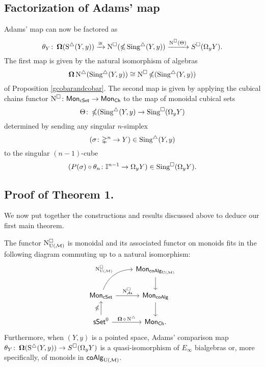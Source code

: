 \subsection{Factorization of Adams' map}\label{factorization}

Adams' map can now be factored as 
$$\theta_Y \colon \operatorname{\mathbf{\Omega}}(\operatorname{S^{\triangle}}(Y, y)) \xrightarrow{\cong} 
\operatorname{N^{\square}}(\operatorname{\mathbb{\Omega}} \operatorname{Sing^{\triangle}}(Y, y)) \xrightarrow{\operatorname{N^{\square}}(\Theta)} 
S^{\square}(\Omega_y Y).$$
The first map is given by the natural isomorphism of algebras $$\operatorname{\mathbf{\Omega}} \operatorname{N^{\triangle}} (\operatorname{Sing^{\triangle}}(Y, y)) \cong  \operatorname{N^{\square}} \operatorname{\mathbb{\Omega}} (\operatorname{Sing^{\triangle}}(Y, y))$$ of Proposition \ref{gcobarandcobar}. The second map is given by applying the cubical chains functor $\operatorname{N^{\square}} \colon \mathsf{Mon}_{\mathsf{cSet}} \to \mathsf{Mon}_{\mathsf{Ch}}$ to the map of monoidal cubical sets
$$\Theta \colon \operatorname{\mathbb{\Omega}} (\operatorname{Sing^{\triangle}}(Y, y) \to \operatorname{Sing^{\square}}( \Omega_yY)$$
determined by sending any singular $n$-simplex $$(\sigma\colon \mathbb{\Delta}^n \to Y) \in \operatorname{Sing^{\triangle}}(Y, y)$$ to the singular $(n-1)$-cube $$(P(\sigma) \circ \theta_n \colon \mathbb{I}^{n-1} \to \Omega_yY) \in \operatorname{Sing^{\square}}( \Omega_yY).$$ 

\subsection{Proof of Theorem 1.}
We now put together the constructions and results discussed above to deduce our first main theorem. 
\begin{theorem}
	The functor $\operatorname{N^{\square}_{{\mathrm{U}(\mathcal{M})}}}$ is monoidal and its associated functor on monoids fits in the following diagram commuting up to a natural isomorphism:
	\begin{equation*}
	\begin{tikzcd}
	& \Mon_{\coAlg_\UM} \arrow[d] \\
	\Mon_{\cSet} \arrow[ru, "\cchainsUM", out=70, in=180] \arrow[r, "\cchainsAS"]
	& \Mon_{\coAlg} \arrow[d] \\
	\sSet^0 \arrow[r, "\cobar \circ \schains"] \arrow[u, "\gcobar"]
	& \Mon_{\Ch}.
	\end{tikzcd}
	\end{equation*}
	Furthermore, when $(Y, y)$ is a pointed space, Adams' comparison map $\theta_Y \colon \operatorname{\mathbf{\Omega}}(\operatorname{S^{\triangle}}(Y, y)) \to S^{\square}(\Omega_y Y)$ is a quasi-isomorphism of $E_\infty$ bialgebras or, more specifically, of monoids in $\mathsf{coAlg}_{\mathrm{U}(\mathcal{M})}$.
\end{theorem} 

